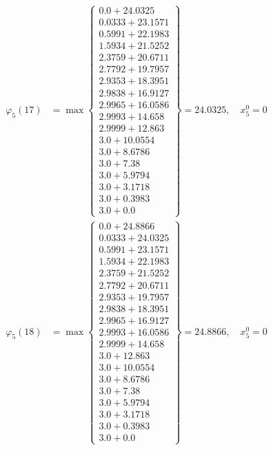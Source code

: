 \documentclass{article}
\begin{document}
\begin{align*}
  
\varphi_{5}(17) &= \max \left\{ \begin{array}{c}
0.0 + 24.0325 \\
 0.0333 + 23.1571 \\
 0.5991 + 22.1983 \\
 1.5934 + 21.5252 \\
 2.3759 + 20.6711 \\
 2.7792 + 19.7957 \\
 2.9353 + 18.3951 \\
 2.9838 + 16.9127 \\
 2.9965 + 16.0586 \\
 2.9993 + 14.658 \\
 2.9999 + 12.863 \\
 3.0 + 10.0554 \\
 3.0 + 8.6786 \\
 3.0 + 7.38 \\
 3.0 + 5.9794 \\
 3.0 + 3.1718 \\
 3.0 + 0.3983 \\
 3.0 + 0.0
\end{array} \right\}=24.0325,\quad x_{5}^0=0\\
  
  
  
  
\varphi_{5}(18) &= \max \left\{ \begin{array}{c}
0.0 + 24.8866 \\
 0.0333 + 24.0325 \\
 0.5991 + 23.1571 \\
 1.5934 + 22.1983 \\
 2.3759 + 21.5252 \\
 2.7792 + 20.6711 \\
 2.9353 + 19.7957 \\
 2.9838 + 18.3951 \\
 2.9965 + 16.9127 \\
 2.9993 + 16.0586 \\
 2.9999 + 14.658 \\
 3.0 + 12.863 \\
 3.0 + 10.0554 \\
 3.0 + 8.6786 \\
 3.0 + 7.38 \\
 3.0 + 5.9794 \\
 3.0 + 3.1718 \\
 3.0 + 0.3983 \\
 3.0 + 0.0
\end{array} \right\}=24.8866,\quad x_{5}^0=0\\
  

\end{align*}
\end{document}

